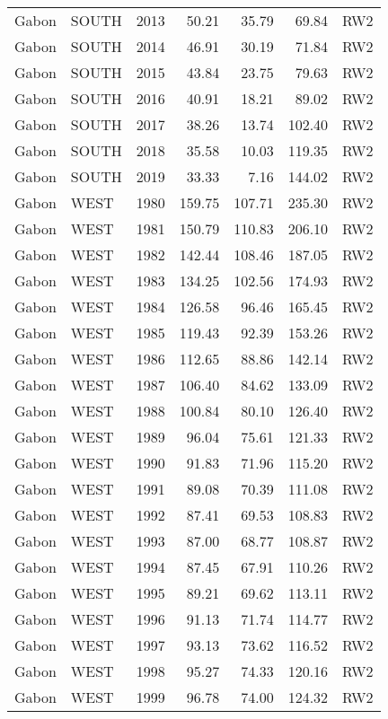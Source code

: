 \begin{longtable}{lllrrrl}
  Gabon & SOUTH & 2013 & 50.21 & 35.79 & 69.84 & RW2 \\ 
  Gabon & SOUTH & 2014 & 46.91 & 30.19 & 71.84 & RW2 \\ 
  Gabon & SOUTH & 2015 & 43.84 & 23.75 & 79.63 & RW2 \\ 
  Gabon & SOUTH & 2016 & 40.91 & 18.21 & 89.02 & RW2 \\ 
  Gabon & SOUTH & 2017 & 38.26 & 13.74 & 102.40 & RW2 \\ 
  Gabon & SOUTH & 2018 & 35.58 & 10.03 & 119.35 & RW2 \\ 
  Gabon & SOUTH & 2019 & 33.33 & 7.16 & 144.02 & RW2 \\ 
  Gabon & WEST & 1980 & 159.75 & 107.71 & 235.30 & RW2 \\ 
  Gabon & WEST & 1981 & 150.79 & 110.83 & 206.10 & RW2 \\ 
  Gabon & WEST & 1982 & 142.44 & 108.46 & 187.05 & RW2 \\ 
  Gabon & WEST & 1983 & 134.25 & 102.56 & 174.93 & RW2 \\ 
  Gabon & WEST & 1984 & 126.58 & 96.46 & 165.45 & RW2 \\ 
  Gabon & WEST & 1985 & 119.43 & 92.39 & 153.26 & RW2 \\ 
  Gabon & WEST & 1986 & 112.65 & 88.86 & 142.14 & RW2 \\ 
  Gabon & WEST & 1987 & 106.40 & 84.62 & 133.09 & RW2 \\ 
  Gabon & WEST & 1988 & 100.84 & 80.10 & 126.40 & RW2 \\ 
  Gabon & WEST & 1989 & 96.04 & 75.61 & 121.33 & RW2 \\ 
  Gabon & WEST & 1990 & 91.83 & 71.96 & 115.20 & RW2 \\ 
  Gabon & WEST & 1991 & 89.08 & 70.39 & 111.08 & RW2 \\ 
  Gabon & WEST & 1992 & 87.41 & 69.53 & 108.83 & RW2 \\ 
  Gabon & WEST & 1993 & 87.00 & 68.77 & 108.87 & RW2 \\ 
  Gabon & WEST & 1994 & 87.45 & 67.91 & 110.26 & RW2 \\ 
  Gabon & WEST & 1995 & 89.21 & 69.62 & 113.11 & RW2 \\ 
  Gabon & WEST & 1996 & 91.13 & 71.74 & 114.77 & RW2 \\ 
  Gabon & WEST & 1997 & 93.13 & 73.62 & 116.52 & RW2 \\ 
  Gabon & WEST & 1998 & 95.27 & 74.33 & 120.16 & RW2 \\ 
  Gabon & WEST & 1999 & 96.78 & 74.00 & 124.32 & RW2 \\ 

\end{longtable}
